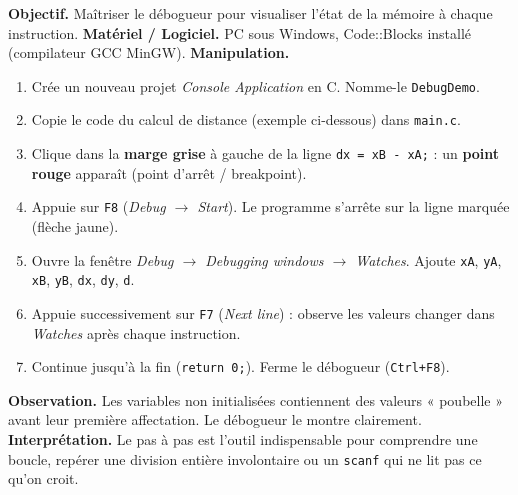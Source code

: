 \documentclass[11pt]{article}
\begin{document}
\begin{experience}
\textbf{Objectif.} Maîtriser le débogueur pour visualiser l'état de la mémoire à chaque instruction.
\textbf{Matériel / Logiciel.} PC sous Windows, Code::Blocks installé (compilateur GCC MinGW).
\textbf{Manipulation.}
\begin{enumerate}
\item Crée un nouveau projet \emph{Console Application} en C. Nomme-le \texttt{DebugDemo}.
\item Copie le code du calcul de distance (exemple ci-dessous) dans \texttt{main.c}.
\item Clique dans la \textbf{marge grise} à gauche de la ligne \texttt{dx = xB - xA;} : un \textbf{point rouge} apparaît (point d'arrêt / breakpoint).
\item Appuie sur \texttt{F8} (\emph{Debug $\to$ Start}). Le programme s'arrête sur la ligne marquée (flèche jaune).
\item Ouvre la fenêtre \emph{Debug $\to$ Debugging windows $\to$ Watches}. Ajoute \texttt{xA}, \texttt{yA}, \texttt{xB}, \texttt{yB}, \texttt{dx}, \texttt{dy}, \texttt{d}.
\item Appuie successivement sur \texttt{F7} (\emph{Next line}) : observe les valeurs changer dans \emph{Watches} après chaque instruction.
\item Continue jusqu'à la fin (\texttt{return 0;}). Ferme le débogueur (\texttt{Ctrl+F8}).
\end{enumerate}
\textbf{Observation.} Les variables non initialisées contiennent des valeurs « poubelle » avant leur première affectation. Le débogueur le montre clairement.
\textbf{Interprétation.} Le pas à pas est l'outil indispensable pour comprendre une boucle, repérer une division entière involontaire ou un \texttt{scanf} qui ne lit pas ce qu'on croit.
\end{experience}
\end{document}
